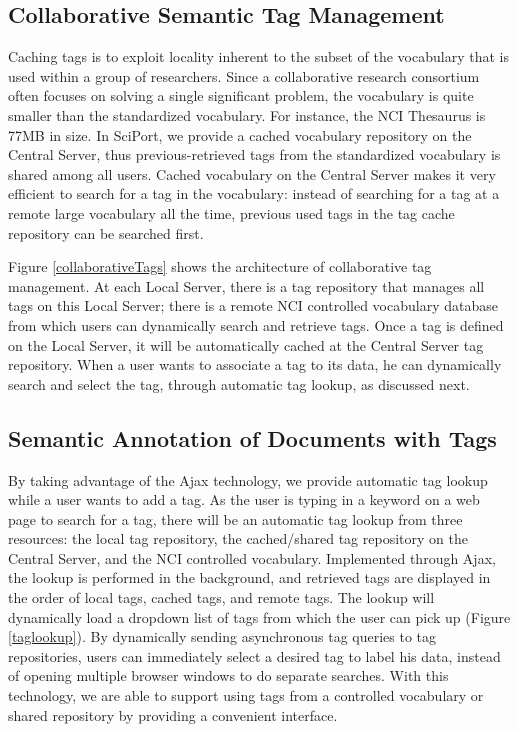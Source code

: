 \documentclass{singlecol-new}
\theoremstyle{TH}{
\newtheorem{lemma}{Lemma}
\newtheorem{theorem}[lemma]{Theorem}
\newtheorem{corrolary}[lemma]{Corrolary}
\newtheorem{conjecture}[lemma]{Conjecture}
\newtheorem{proposition}[lemma]{Proposition}
\newtheorem{claim}[lemma]{Claim}
\newtheorem{stheorem}[lemma]{Wrong Theorem}
\newtheorem{algorithm}{Algorithm}
}
\theoremstyle{THrm}{
\newtheorem{definition}{Definition}[section]
\newtheorem{question}{Question}[section]
\newtheorem{remark}{Remark}
\newtheorem{scheme}{Scheme}
}
\theoremstyle{THhit}{
\newtheorem{case}{Case}[section]
}
\begin{document}
\begin{figure*}[t] \center%
\caption{An Example of Automatic Tag Lookup} \label{taglookup}
\end{figure*}

\subsection{Collaborative Semantic Tag Management} \label{sec:coltag}

Caching tags is to exploit locality inherent to the subset of the
vocabulary that is used within a group of researchers. Since a
collaborative research consortium often focuses on solving a single
significant problem, the vocabulary is quite smaller than the
standardized vocabulary. For instance, the NCI Thesaurus
\cite{ncithesaurus} is 77MB in size.  In SciPort, we provide a
cached vocabulary repository on the Central Server, thus
previous-retrieved tags from the standardized vocabulary is shared
among all users.   Cached vocabulary on the Central Server makes it
very efficient to search for a tag in the vocabulary: instead of
searching for a tag at a remote large vocabulary all the time,
previous used tags in the tag cache repository can be searched
first.

Figure \ref{collaborativeTags} shows the architecture of
collaborative tag management. At each Local Server, there is a tag
repository that manages all tags on this Local Server; there is a
remote NCI controlled vocabulary database from which users can
dynamically search and retrieve tags. Once a tag is defined on the
Local Server, it will  be automatically cached at the Central Server
tag repository. When a user wants to associate a tag to its data, he
can dynamically search and select the tag, through automatic tag
lookup, as discussed next.

\subsection{Semantic Annotation of Documents with Tags}
By taking advantage of the Ajax technology, we provide automatic tag
lookup while a user wants to add a tag. As the user is typing in a
keyword on a web page to search for a tag, there will be an
automatic tag lookup from three resources: the local tag repository,
the cached/shared tag repository on the Central Server, and the NCI
controlled vocabulary. Implemented through Ajax, the lookup is
performed in the background, and retrieved tags are displayed in the
order of local tags, cached tags, and remote tags.  The lookup will
dynamically load a dropdown list of tags from which the user can
pick up (Figure \ref{taglookup}). By dynamically sending
asynchronous tag queries to tag repositories, users can immediately
select a desired tag to label his data, instead of opening multiple
browser windows to do separate searches.  With this technology, we
are able to support using tags from a controlled vocabulary or
shared repository by providing a convenient interface.
\end{document}
